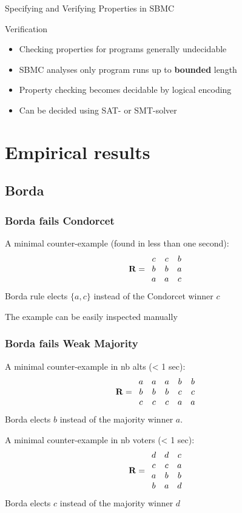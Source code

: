 \documentclass[french,english]{beamer}
\begin{document}
\begin{frame}{Specifying and Verifying Properties in SBMC\hspace*{-1.8em}}
\begin{block}{Verification}
\begin{itemize}
\item Checking properties for programs generally undecidable
\item SBMC analyses only program runs up to \textbf{bounded} length
\item Property checking becomes decidable by logical encoding
\item Can be decided using SAT- or SMT-solver
\end{itemize}
\end{block}
\end{frame}

\section{Empirical results}
\subsection{Borda}
\begin{frame}
	\frametitle{Borda fails Condorcet}
	A minimal counter-example (found in less than one second):
	\begin{equation}
		\mathbf{R} =
		\begin{array}{ccc}
			c	&	c	&	b\\
			b	&	b	&	a\\
			a	&	a	&	c
		\end{array}
	\end{equation}
	Borda rule elects $\{a,c\}$ instead of the Condorcet winner $c$
	
	The example can be easily inspected manually
\end{frame}

\begin{frame}
	\frametitle{Borda fails Weak Majority}
	A minimal counter-example in nb alts (< 1 sec):
	\begin{equation}
		\mathbf{R} =
		\begin{array}{ccccc}
			a	&	a	&	a	&	b	&	b\\
			b	&	b	&	b	&	c	&	c\\
			c	&	c	&	c	&	a	&	a
		\end{array}
	\end{equation}
	Borda elects $b$ instead of the majority winner $a$.

	A minimal counter-example in nb voters (< 1 sec):
	\begin{equation}
		\mathbf{R} =
		\begin{array}{ccc}
			d	&	d	&	c\\
			c	&	c	&	a\\
			a	&	b	&	b\\
			b	&	a	&	d
		\end{array}
	\end{equation}
	Borda elects $c$ instead of the majority winner $d$
\end{frame}
\end{document}
